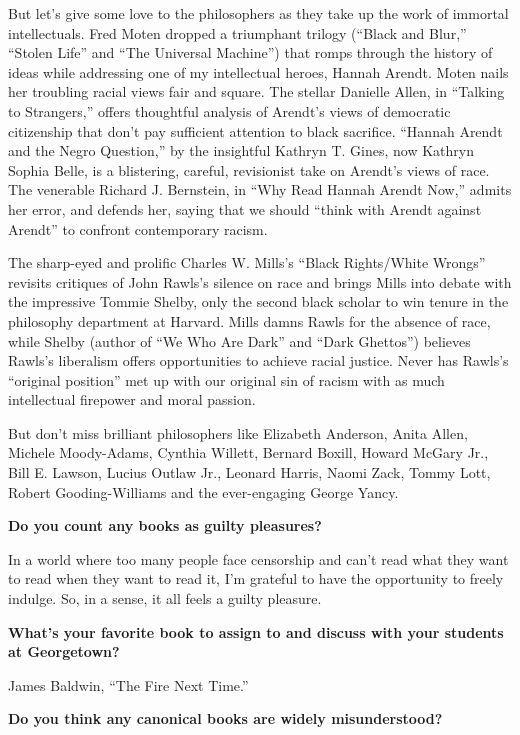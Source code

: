 But let's give some love to the philosophers as they take up the work of
immortal intellectuals. Fred Moten dropped a triumphant trilogy (``Black
and Blur,'' ``Stolen Life'' and ``The Universal Machine'') that romps
through the history of ideas while addressing one of my intellectual
heroes, Hannah Arendt. Moten nails her troubling racial views fair and
square. The stellar Danielle Allen, in ``Talking to Strangers,'' offers
thoughtful analysis of Arendt's views of democratic citizenship that
don't pay sufficient attention to black sacrifice. ``Hannah Arendt and
the Negro Question,'' by the insightful Kathryn T. Gines, now Kathryn
Sophia Belle, is a blistering, careful, revisionist take on Arendt's
views of race. The venerable Richard J. Bernstein, in ``Why Read Hannah
Arendt Now,'' admits her error, and defends her, saying that we should
``think with Arendt against Arendt'' to confront contemporary racism.

The sharp-eyed and prolific Charles W. Mills's ``Black Rights/White
Wrongs'' revisits critiques of John Rawls's silence on race and brings
Mills into debate with the impressive Tommie Shelby, only the second
black scholar to win tenure in the philosophy department at Harvard.
Mills damns Rawls for the absence of race, while Shelby (author of ``We
Who Are Dark'' and ``Dark Ghettos'') believes Rawls's liberalism offers
opportunities to achieve racial justice. Never has Rawls's ``original
position'' met up with our original sin of racism with as much
intellectual firepower and moral passion.

But don't miss brilliant philosophers like Elizabeth Anderson, Anita
Allen, Michele Moody-Adams, Cynthia Willett, Bernard Boxill, Howard
McGary Jr., Bill E. Lawson, Lucius Outlaw Jr., Leonard Harris, Naomi
Zack, Tommy Lott, Robert Gooding-Williams and the ever-engaging George
Yancy.

\textbf{Do you count any books as guilty pleasures?}

In a world where too many people face censorship and can't read what
they want to read when they want to read it, I'm grateful to have the
opportunity to freely indulge. So, in a sense, it all feels a guilty
pleasure.

\textbf{What's your favorite book to assign to and discuss with your
students at Georgetown?}

James Baldwin, ``The Fire Next Time.''

\textbf{Do you think any canonical books are widely misunderstood?}

